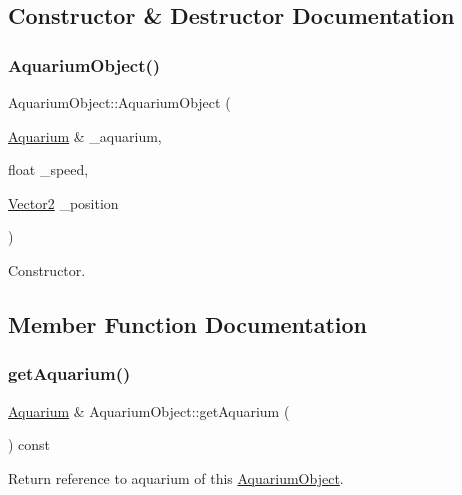 \subsection{Constructor \& Destructor Documentation}
\mbox{\label{class_aquarium_object_aebe6958a63cab1a4277006d335d3c968}} 
\subsubsection{\texorpdfstring{Aquarium\+Object()}{AquariumObject()}}
{\footnotesize\ttfamily Aquarium\+Object\+::\+Aquarium\+Object (\begin{DoxyParamCaption}\item[{\mbox{\hyperlink{class_aquarium}{Aquarium}} \&}]{\+\_\+aquarium,  }\item[{float}]{\+\_\+speed,  }\item[{\mbox{\hyperlink{struct_vector2}{Vector2}}}]{\+\_\+position }\end{DoxyParamCaption})}



Constructor. 



\subsection{Member Function Documentation}
\mbox{\label{class_aquarium_object_a229f2c41d3aa352bcbd7b994dd540f97}} 
\subsubsection{\texorpdfstring{get\+Aquarium()}{getAquarium()}}
{\footnotesize\ttfamily \mbox{\hyperlink{class_aquarium}{Aquarium}} \& Aquarium\+Object\+::get\+Aquarium (\begin{DoxyParamCaption}{ }\end{DoxyParamCaption}) const}



Return reference to aquarium of this \mbox{\hyperlink{class_aquarium_object}{Aquarium\+Object}}. 

\mbox{\label{class_aquarium_object_aed4986687e54beb0ce780a9cafbda990}} 
